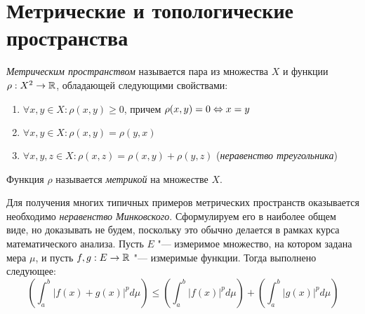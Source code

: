 \section{Метрические и топологические пространства}

\begin{definition}
	\textit{Метрическим пространством} называется пара из множества $X$ и функции $\rho : X^2 \to \mathbb{R}$, обладающей следующими свойствами:
	\begin{enumerate}
		\item $\forall x, y \in X: \rho(x, y) \ge 0$, причем $\rho(x, y) = 0 \Leftrightarrow x = y$
		\item $\forall x, y \in X: \rho(x, y) = \rho(y, x)$
		\item $\forall x, y, z \in X: \rho(x, z) = \rho(x, y) + \rho(y, z)$ (\textit{неравенство треугольника})
	\end{enumerate}

	Функция $\rho$ называется \textit{метрикой} на множестве $X$.
\end{definition}

\begin{note}
	Для получения многих типичных примеров метрических пространств оказывается необходимо \textit{неравенство Минковского}. Сформулируем его в наиболее общем виде, но доказывать не будем, поскольку это обычно делается в рамках курса математического анализа. Пусть $E$ "--- измеримое множество, на котором задана мера $\mu$, и пусть $f, g: E \to \mathbb{R}$ "--- измеримые функции. Тогда выполнено следующее:
	\[\left(\int_a^b|f(x) + g(x)|^pd\mu\right) \le \left(\int_a^b|f(x)|^pd\mu\right) + \left(\int_a^b|g(x)|^pd\mu\right)\]
\end{note}

